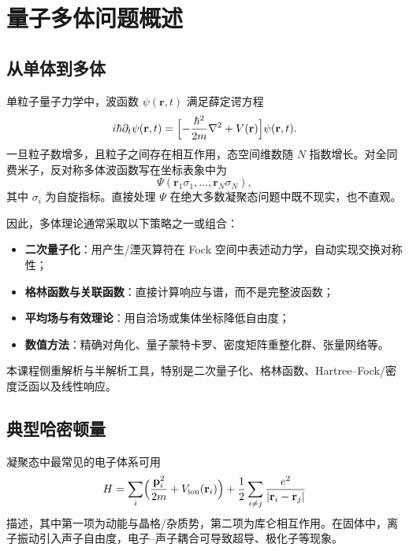 \section{量子多体问题概述}

\subsection{从单体到多体}

单粒子量子力学中，波函数 $\psi(\mathbf{r},t)$ 满足薛定谔方程
\begin{equation}
  i\hbar\partial_t\psi(\mathbf{r},t)
  =\Bigl[-\frac{\hbar^2}{2m}\nabla^2+V(\mathbf{r})\Bigr]\psi(\mathbf{r},t).
\end{equation}
一旦粒子数增多，且粒子之间存在相互作用，态空间维数随 $N$ 指数增长。对全同费米子，反对称多体波函数写在坐标表象中为
\begin{equation}
  \Psi(\mathbf{r}_1\sigma_1,\ldots,\mathbf{r}_N\sigma_N),
\end{equation}
其中 $\sigma_i$ 为自旋指标。直接处理 $\Psi$ 在绝大多数凝聚态问题中既不现实，也不直观。

因此，多体理论通常采取以下策略之一或组合：
\begin{itemize}
  \item \textbf{二次量子化}：用产生/湮灭算符在 Fock 空间中表述动力学，自动实现交换对称性；
  \item \textbf{格林函数与关联函数}：直接计算响应与谱，而不是完整波函数；
  \item \textbf{平均场与有效理论}：用自洽场或集体坐标降低自由度；
  \item \textbf{数值方法}：精确对角化、量子蒙特卡罗、密度矩阵重整化群、张量网络等。
\end{itemize}

本课程侧重解析与半解析工具，特别是二次量子化、格林函数、Hartree--Fock/密度泛函以及线性响应。

\subsection{典型哈密顿量}

凝聚态中最常见的电子体系可用
\begin{equation}
  H=\sum_i\Bigl(\frac{\mathbf{p}_i^2}{2m}+V_{\mathrm{ion}}(\mathbf{r}_i)\Bigr)
  +\frac12\sum_{i\neq j}\frac{e^2}{|\mathbf{r}_i-\mathbf{r}_j|}
\end{equation}
描述，其中第一项为动能与晶格/杂质势，第二项为库仑相互作用。在固体中，离子振动引入声子自由度，电子–声子耦合可导致超导、极化子等现象。

